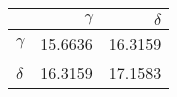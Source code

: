 \begin{tabular}{lrr}
\toprule
 & $\gamma$ & $\delta$ \\
\midrule
$\gamma$ & 15.6636 & 16.3159 \\
$\delta$ & 16.3159 & 17.1583 \\
\bottomrule
\end{tabular}
